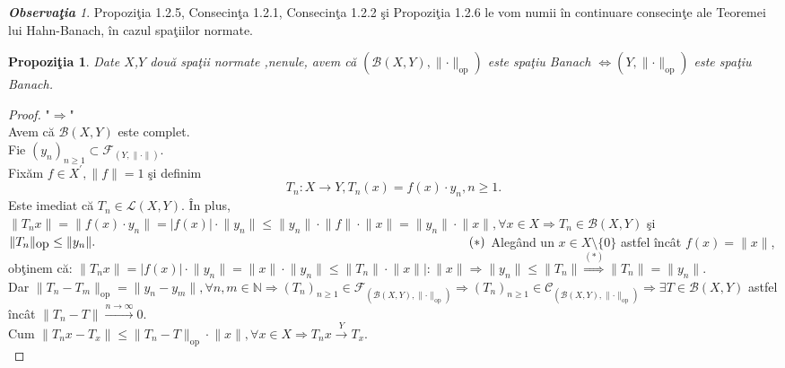 \documentclass[ a4paper, 12pt]{report}
\newtheorem{prop}[theorem]{\bf Propozi\c tia }
\theoremstyle{definition}
\theoremstyle{remark}
\newtheorem{obs}{\bf Observa\c tia }[section]
\numberwithin{equation}{section}
\begin{document}
\begin{obs}
Propozi\c tia 1.2.5, Consecin\c ta 1.2.1, Consecin\c ta 1.2.2 \c si Propozi\c tia 1.2.6 le vom numii \^in continuare consecin\c te ale Teoremei lui Hahn-Banach, \^in cazul spa\c tiilor normate.
\end{obs}
\begin{prop}
Date $X$,$Y$ dou\u a spa\c tii normate ,nenule, avem c\u a $(\mathcal{B}(X,Y), \lVert \cdot \rVert_{\mbox{op}}) $ este spa\c tiu Banach $\Longleftrightarrow (Y, \lVert \cdot \rVert_{\mbox{op}})$ este spa\c tiu Banach.
\end{prop}
\begin{proof}
"$\Longrightarrow$"\\
Avem c\u a $\mathcal{B}(X,Y)$ este complet.\\
Fie $(y_n)_{n \geq 1} \subset \mathcal{F}_{(Y,\lVert \cdot \rVert)}.$\\
Fix\u am $f \in X^{'}, \lVert f \rVert = 1$ \c si definim
\[ T_n : X \rightarrow Y, T_n(x) = f(x) \cdot y_n, n \geq 1.\]
Este imediat c\u a $T_n \in \mathcal{L}(X,Y).$ \^In plus, $\lVert T_n x \rVert = \lVert f(x) \cdot y_n  \rVert = \lvert f(x) \rvert \cdot \lVert y_n \rVert \leq \lVert y_n \rVert \cdot \lVert f \rVert \cdot \lVert x \rVert = \lVert y_n  \rVert \cdot \lVert x \rVert, \forall x \in X \Rightarrow T_n \in \mathcal{B}(X,Y)$ \c si\\
 $\lVert T_n \rVert_{\mbox{op}} \leq \lVert y_n \rVert. \hspace{105mm} (\ast)$
Aleg\^and un $x \in X \setminus\{0\}$ astfel \^inc\^at $f(x) = \lVert x \rVert$, ob\c tinem c\u a: $\lVert T_n x \rVert = \lvert f(x) \rvert \cdot \lVert y_n \rVert = \lVert x \rVert \cdot \lVert y_n \rVert \leq \lVert T_n  \rVert \cdot \lVert x \rVert \Big| :\lVert x \rVert \Rightarrow \lVert y_n \rVert \leq \lVert T_n \rVert \stackrel{(\ast)}{\Rightarrow}\lVert T_n \rVert = \lVert y_n \rVert.$\\
Dar $\lVert T_n -T_m  \rVert_{\mbox{op}} = \lVert y_n - y_m \rVert, \forall n,m \in \mathbb{N} \Rightarrow (T_n)_{n \geq 1} \in \mathcal{F}_{\left(\mathcal{B}(X,Y), \lVert \cdot  \rVert_{\mbox{op}}\right)}  \Rightarrow (T_n)_{n \geq 1} \in \mathcal{C}_{\left( \mathcal{B}(X,Y), \lVert \cdot  \rVert_{\mbox{op}} \right)} \Rightarrow \exists T \in \mathcal{B}(X,Y) $ astfel \^inc\^at $\lVert T_n - T  \rVert \stackrel{n \rightarrow \infty}{\longrightarrow} 0.$\\
Cum $\lVert T_n x - T_x \rVert \leq \lVert T_n - T  \rVert_{\mbox{op}} \cdot \lVert x \rVert, \forall x \in X \Rightarrow T_n x \stackrel{Y}{\longrightarrow} T_x.$\\

\end{proof}
\end{document}
